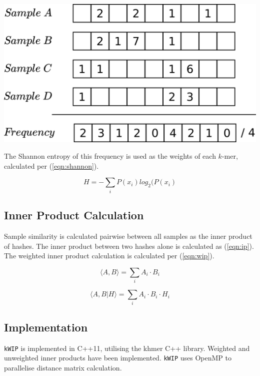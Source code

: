 \documentclass[a0,portrait]{a0poster}
\begin{document}
\begin{multicols}{2}
\begin{center}
  \vspace{1cm}
  \includegraphics[width=16cm]{freq_vector.png}
  \vspace{1cm}
\end{center}

The Shannon entropy of this frequency is used as the weights of each $k$-mer,
calculated per (\ref{eqn:shannon}).

\begin{equation}
    H = - \sum_{i} P(x_i) log_2(P(x_i)
\label{eqn:shannon}
\end{equation}

\subsection*{Inner Product Calculation}

Sample similarity is calculated pairwise between all samples as the inner
product of hashes. The inner product between two hashes alone is calculated as
(\ref{eqn:ip}). The weighted inner product calculation is calculated per
(\ref{eqn:wip}).

\begin{equation}
  \langle A, B \rangle = \sum_{i} A_i \cdot B_i
\label{eqn:ip}
\end{equation}

\begin{equation}
  \langle A, B | H \rangle = \sum_{i} A_i \cdot B_i \cdot H_i
\label{eqn:wip}
\end{equation}

\subsection*{Implementation}

\texttt{kWIP} is implemented in C++11, utilising the khmer C++ library. Weighted
and unweighted inner products have been implemented. \texttt{kWIP} uses OpenMP
to parallelise distance matrix calculation.



\end{multicols}
\end{document}
